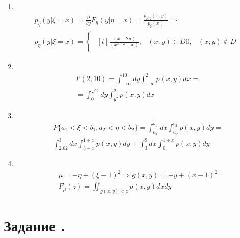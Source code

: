 \documentclass[12pt]{article}
\begin{document}
\begin{enumerate}
	\item \mbox{}\\
	      \begin{gather*}
		      p_{\eta}(y|\xi = x) = \frac{\partial}{\partial y}F_{\eta}(y|\eta = x)
		      = \frac{p_{\xi, \eta}(x, y)}{p_{\xi}(x)} \Rightarrow \\
		      p_{\eta}(y|\xi = x) =
		      \begin{cases}
			      \begin{aligned}[t]
				      \frac{(x + 2y)}{(x^{3\div2} + x)}, & (x;y) \in D
				      0,                                 & (x;y) \notin D
			      \end{aligned}
		      \end{cases}
	      \end{gather*}

	\item \mbox{}\\
	      \begin{gather*}
		      F(2,10) = \int_{-\infty}^{10}dy\int_{-\infty}^{2}p(x, y)dx = \\
		      = \int_{0}^{\sqrt{2}}dy\int_{y^2}^{2}p(x, y)dx
	      \end{gather*}

	\item \mbox{}\\
	      \begin{gather*}
		      P\{a_1 < \xi < b_1, a_2 < \eta < b_2\} = \int_{a_1}^{b_1}dx\int_{a_2}^{b_2}p(x, y)dy = \\
		      \int_{2.62}^{3}dx\int_{3 - x}^{1\div{x}}p(x, y)dy +
		      \int_{3}^{9}dx\int_{0}^{1\div{x}}p(x, y)dy
	      \end{gather*}

	\item \mbox{}\\
	      \begin{gather*}
		      \mu = -\eta + (\xi - 1)^2 \Rightarrow g(x, y) = -y + (x - 1)^2 \\
		      F_{\mu}(z) = \iint_{g(x, y) < z} p(x,y)dxdy
	      \end{gather*}

\end{enumerate}

\section*{Задание .}
\end{document}
